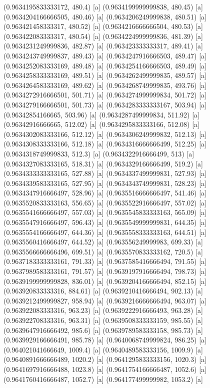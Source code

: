 {{{(0.9634195833333172, 480.4) [a] 
(0.9634199999999838, 480.45) [a] 
(0.9634204166666505, 480.46) [a] 
(0.9634206249999838, 480.51) [a] 
(0.963421458333317, 480.52) [a] 
(0.9634216666666504, 480.53) [a] 
(0.963422083333317, 480.54) [a] 
(0.9634224999999836, 481.39) [a] 
(0.9634231249999836, 482.87) [a] 
(0.963423333333317, 489.41) [a] 
(0.9634243749999837, 489.43) [a] 
(0.9634247916666503, 489.47) [a] 
(0.9634252083333169, 489.48) [a] 
(0.9634254166666503, 489.49) [a] 
(0.9634258333333169, 489.51) [a] 
(0.9634262499999835, 489.57) [a] 
(0.9634264583333169, 489.62) [a] 
(0.9634268749999835, 493.76) [a] 
(0.9634272916666501, 501.71) [a] 
(0.9634274999999834, 501.72) [a] 
(0.9634279166666501, 501.73) [a] 
(0.9634283333333167, 503.94) [a] 
(0.96342854166665, 503.96) [a] 
(0.9634287499999834, 511.92) [a] 
(0.96342916666665, 512.02) [a] 
(0.9634295833333166, 512.08) [a] 
(0.9634302083333166, 512.12) [a] 
(0.9634306249999832, 512.13) [a] 
(0.9634308333333166, 512.18) [a] 
(0.9634316666666499, 512.25) [a] 
(0.9634318749999833, 512.3) [a] 
(0.9634322916666499, 513) [a] 
(0.9634327083333165, 518.31) [a] 
(0.9634329166666499, 519.2) [a] 
(0.9634333333333165, 527.88) [a] 
(0.9634337499999831, 527.93) [a] 
(0.9634339583333165, 527.95) [a] 
(0.9634343749999831, 528.23) [a] 
(0.9634347916666497, 528.96) [a] 
(0.9635516666666497, 541.46) [a] 
(0.9635520833333163, 556.65) [a] 
(0.9635522916666497, 557.02) [a] 
(0.9635541666666497, 557.03) [a] 
(0.9635545833333163, 565.09) [a] 
(0.9635547916666497, 596.43) [a] 
(0.9635549999999831, 644.35) [a] 
(0.9635554166666497, 644.36) [a] 
(0.9635558333333163, 644.51) [a] 
(0.9635560416666497, 644.52) [a] 
(0.963556249999983, 699.33) [a] 
(0.9635566666666496, 699.51) [a] 
(0.9635570833333162, 720.5) [a] 
(0.9637183333333161, 791.33) [a] 
(0.9637585416666494, 791.55) [a] 
(0.9637989583333161, 791.57) [a] 
(0.9639197916666494, 798.73) [a] 
(0.9639199999999828, 836.01) [a] 
(0.9639204166666494, 852.15) [a] 
(0.963920833333316, 884.61) [a] 
(0.9639210416666494, 902.13) [a] 
(0.9639212499999827, 958.94) [a] 
(0.9639216666666494, 963.07) [a] 
(0.963922083333316, 963.23) [a] 
(0.9639222916666493, 963.28) [a] 
(0.963922708333316, 963.31) [a] 
(0.9639508333333159, 985.55) [a] 
(0.9639647916666492, 985.6) [a] 
(0.9639789583333158, 985.73) [a] 
(0.9639929166666491, 985.78) [a] 
(0.9640068749999824, 986.25) [a] 
(0.964021041666649, 1009.4) [a] 
(0.9640489583333156, 1009.9) [a] 
(0.9640891666666489, 1020.2) [a] 
(0.9641295833333156, 1020.3) [a] 
(0.9641697916666488, 1023.8) [a] 
(0.9641754166666487, 1052.6) [a] 
(0.9641760416666487, 1052.7) [a] 
(0.964177499999982, 1053.2) [a] 
}}}
